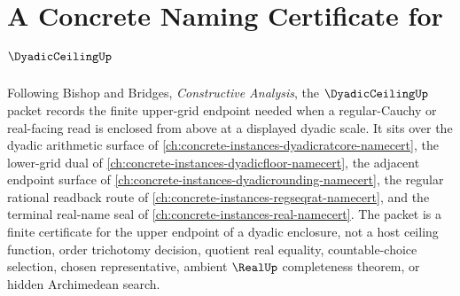 \chapter{A Concrete Naming Certificate for $\DyadicCeilingUp$}
\label{ch:concrete-instances-dyadic-ceiling-namecert}

Following Bishop and Bridges, \emph{Constructive Analysis}, the $\DyadicCeilingUp$ packet records the finite upper-grid endpoint needed when a regular-Cauchy or real-facing read is enclosed from above at a displayed dyadic scale. It sits over the dyadic arithmetic surface of \autoref{ch:concrete-instances-dyadicratcore-namecert}, the lower-grid dual of \autoref{ch:concrete-instances-dyadicfloor-namecert}, the adjacent endpoint surface of \autoref{ch:concrete-instances-dyadicrounding-namecert}, the regular rational readback route of \autoref{ch:concrete-instances-regseqrat-namecert}, and the terminal real-name seal of \autoref{ch:concrete-instances-real-namecert}. The packet is a finite certificate for the upper endpoint of a dyadic enclosure, not a host ceiling function, order trichotomy decision, quotient real equality, countable-choice selection, chosen representative, ambient $\RealUp$ completeness theorem, or hidden Archimedean search.

